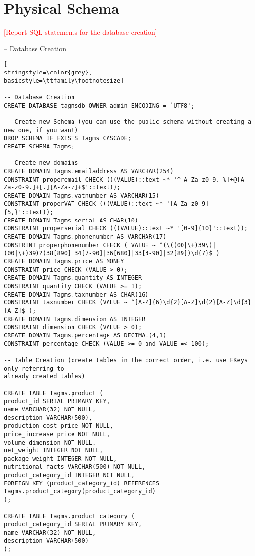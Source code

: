 \section{Physical Schema}
\textcolor{red}{[Report SQL statements for the database creation]}

-- Database Creation
\begin{lstlisting}[
stringstyle=\color{grey},
basicstyle=\ttfamily\footnotesize]

-- Database Creation
CREATE DATABASE tagmsdb OWNER admin ENCODING = `UTF8';

-- Create new Schema (you can use the public schema without creating a new one, if you want)
DROP SCHEMA IF EXISTS Tagms CASCADE;
CREATE SCHEMA Tagms;

-- Create new domains
CREATE DOMAIN Tagms.emailaddress AS VARCHAR(254)
CONSTRAINT properemail CHECK (((VALUE)::text ~* '^[A-Za-z0-9._%]+@[A-Za-z0-9.]+[.][A-Za-z]+$'::text));
CREATE DOMAIN Tagms.vatnumber AS VARCHAR(15)
CONSTRAINT properVAT CHECK (((VALUE)::text ~* '[A-Za-z0-9]{5,}'::text));
CREATE DOMAIN Tagms.serial AS CHAR(10)
CONSTRAINT properserial CHECK (((VALUE)::text ~* '[0-9]{10}'::text));
CREATE DOMAIN Tagms.phonenumber AS VARCHAR(17)
CONSTRINT properphonenumber CHECK ( VALUE ~ ^(\((00|\+)39\)|(00|\+)39)?(38[890]|34[7-90]|36[680]|33[3-90]|32[89])\d{7}$ )
CREATE DOMAIN Tagms.price AS MONEY
CONSTRAINT price CHECK (VALUE > 0);
CREATE DOMAIN Tagms.quantity AS INTEGER
CONSTRAINT quantity CHECK (VALUE >= 1);
CREATE DOMAIN Tagms.taxnumber AS CHAR(16)
CONSTRAINT taxnumber CHECK (VALUE ~ ^[A-Z]{6}\d{2}[A-Z]\d{2}[A-Z]\d{3}[A-Z]$ );
CREATE DOMAIN Tagms.dimension AS INTEGER
CONSTRAINT dimension CHECK (VALUE > 0);
CREATE DOMAIN Tagms.percentage AS DECIMAL(4,1)
CONSTRAINT percentage CHECK (VALUE >= 0 and VALUE =< 100);

-- Table Creation (create tables in the correct order, i.e. use FKeys only referring to
already created tables)

CREATE TABLE Tagms.product (
product_id SERIAL PRIMARY KEY,
name VARCHAR(32) NOT NULL,
description VARCHAR(500),
production_cost price NOT NULL,
price_increase price NOT NULL,
volume dimension NOT NULL,
net_weight INTEGER NOT NULL,
package_weight INTEGER NOT NULL,
nutritional_facts VARCHAR(500) NOT NULL,
product_category_id INTEGER NOT NULL,
FOREIGN KEY (product_category_id) REFERENCES Tagms.product_category(product_category_id)
);

CREATE TABLE Tagms.product_category (
product_category_id SERIAL PRIMARY KEY,
name VARCHAR(32) NOT NULL,
description VARCHAR(500)
);


\end{lstlisting}

